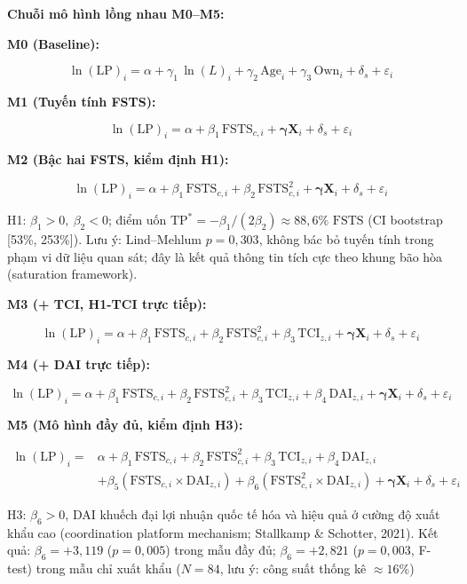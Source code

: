 \documentclass[
  a4paper,
  13pt]{extreport}
\begin{document}
\textbf{Chuỗi mô hình lồng nhau M0--M5:}

\textbf{M0 (Baseline):}

\[\ln(\mathrm{LP})_i = \alpha + \gamma_1\,\ln(L)_{i} + \gamma_2\,\mathrm{Age}_i + \gamma_3\,\mathrm{Own}_i + \delta_s + \varepsilon_i\]

\textbf{M1 (Tuyến tính FSTS):}

\[\ln(\mathrm{LP})_i = \alpha + \beta_1\,\mathrm{FSTS}_{c,i} + \boldsymbol{\gamma}\mathbf{X}_i + \delta_s + \varepsilon_i\]

\textbf{M2 (Bậc hai FSTS, kiểm định H1):}

\[\ln(\mathrm{LP})_i = \alpha + \beta_1\,\mathrm{FSTS}_{c,i} + \beta_2\,\mathrm{FSTS}_{c,i}^{2} + \boldsymbol{\gamma}\mathbf{X}_i + \delta_s + \varepsilon_i\]

H1: \(\beta_1 > 0,\ \beta_2 < 0\); điểm uốn
\(\mathrm{TP}^{*} = -\beta_1/(2\beta_2) \approx 88{,}6\%\)
\(\mathrm{FSTS}\) (CI bootstrap {[}53\%, 253\%{]}). Lưu ý: Lind--Mehlum
\(p = 0{,}303\), không bác bỏ tuyến tính trong phạm vi dữ liệu quan sát;
đây là kết quả thông tin tích cực theo khung bão hòa (saturation
framework).

\textbf{M3 (+ TCI, H1-TCI trực tiếp):}

\[\ln(\mathrm{LP})_i = \alpha + \beta_1\,\mathrm{FSTS}_{c,i} + \beta_2\,\mathrm{FSTS}_{c,i}^{2} + \beta_3\,\mathrm{TCI}_{z,i} + \boldsymbol{\gamma}\mathbf{X}_i + \delta_s + \varepsilon_i\]

\textbf{M4 (+ DAI trực tiếp):}

\[\ln(\mathrm{LP})_i = \alpha + \beta_1\,\mathrm{FSTS}_{c,i} + \beta_2\,\mathrm{FSTS}_{c,i}^{2} + \beta_3\,\mathrm{TCI}_{z,i} + \beta_4\,\mathrm{DAI}_{z,i} + \boldsymbol{\gamma}\mathbf{X}_i + \delta_s + \varepsilon_i\]

\textbf{M5 (Mô hình đầy đủ, kiểm định H3):}

\[\begin{aligned}
\ln(\mathrm{LP})_i = {} & \alpha + \beta_1\,\mathrm{FSTS}_{c,i} + \beta_2\,\mathrm{FSTS}_{c,i}^{2} + \beta_3\,\mathrm{TCI}_{z,i} + \beta_4\,\mathrm{DAI}_{z,i} \\
& + \beta_5(\mathrm{FSTS}_{c,i} \times \mathrm{DAI}_{z,i}) + \beta_6(\mathrm{FSTS}_{c,i}^{2} \times \mathrm{DAI}_{z,i}) + \boldsymbol{\gamma}\mathbf{X}_i + \delta_s + \varepsilon_i
\end{aligned}\]

H3: \(\beta_6 > 0\), DAI khuếch đại lợi nhuận quốc tế hóa và hiệu quả ở
cường độ xuất khẩu cao (coordination platform mechanism; Stallkamp \&
Schotter, 2021). Kết quả: \(\beta_6 = +3{,}119\) (\(p = 0{,}005\)) trong
mẫu đầy đủ; \(\beta_6 = +2{,}821\) (\(p = 0{,}003\), F-test) trong mẫu
chỉ xuất khẩu (\(N = 84\), lưu ý: công suất thống kê \(\approx 16\%\))
\end{document}
